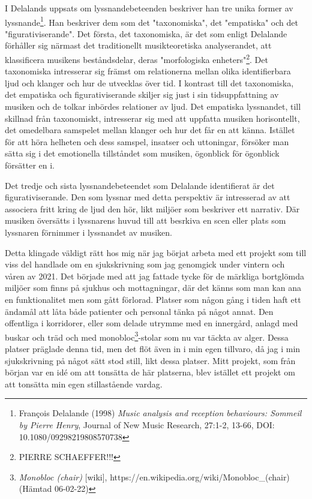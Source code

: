 \documentclass{article}
\begin{document}
I Delalands uppsats om lyssnandebeteenden beskriver han tre unika former av lyssnande\footnote{François
Delalande (1998) \emph{Music analysis and reception behaviours: Sommeil by Pierre Henry}, Journal of New Music
Research, 27:1-2, 13-66, DOI: 10.1080/09298219808570738}. Han beskriver dem som det "taxonomiska", det
"empatiska" och det "figurativiserande". Det första, det taxonomiska, är det som enligt Delalande förhåller sig
närmast det traditionellt musikteoretiska analyserandet, att klassificera musikens beståndsdelar, deras
"morfologiska enheters"\footnote{PIERRE SCHAEFFER!!!}. Det taxonomiska intresserar sig främst om relationerna
mellan olika identifierbara ljud och klanger och hur de utvecklas över tid. I kontrast till det taxonomiska,
det empatiska och figurativiserande skiljer sig just i sin tidsuppfattning av musiken och de tolkar inbördes
relationer av ljud. Det empatiska lyssnandet, till skillnad från taxonomiskt, intresserar sig med att
uppfatta musiken horisontellt, det omedelbara samspelet mellan klanger och hur det får en att känna. Istället
för att höra helheten och dess samspel, insatser och uttoningar, försöker man sätta sig i det emotionella
tillståndet som musiken, ögonblick för ögonblick försätter en i. 


Det tredje och sista lyssnandebeteendet som Delalande identifierat är det figurativiserande. Den som lyssnar med
detta perspektiv är intresserad av att associera fritt kring de ljud den hör, likt miljöer som beskriver ett
narrativ. Där musiken översätts i lyssnarens huvud till att besrkiva en scen eller plats som lyssnaren
förnimmer i lyssnandet av musiken.

Detta klingade väldigt rätt hos mig när jag börjat arbeta med ett projekt som till viss del handlade om en
sjukskrivning som jag genomgick under vintern och våren av 2021. Det började med att jag fattade tycke för de
märkliga bortglömda miljöer som finns på sjukhus och mottagningar, där det känns som man kan ana en
funktionalitet men som gått förlorad. Platser som någon gång i tiden haft ett ändamål att låta både patienter
och personal tänka på något annat. Den offentliga i korridorer, eller som delade utrymme med
en innergård, anlagd med buskar och träd och med monobloc\footnote{\emph{Monobloc
(chair)} [wiki], https://en.wikipedia.org/wiki/Monobloc\_(chair) (Hämtad 06-02-22)}-stolar som nu var täckta av
alger. Dessa platser präglade denna tid, men det flöt även in i min egen tillvaro, då jag i min sjukskrivning
på något sätt stod still, likt dessa platser. Mitt projekt, som från början var en idé om att tonsätta de här
platserna, blev istället ett projekt om att tonsätta min egen stillastående vardag. 
\end{document}
